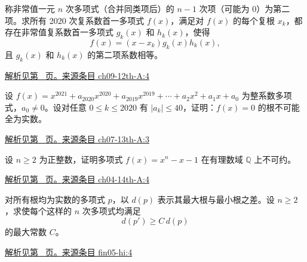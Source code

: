 \documentclass[UTF8,12pt,a4paper,fontset=fandol]{ctexart}
\begin{document}
\begin{example}\label{ex:ch09-12th-A:4}

称非常值一元 $n$ 次多项式（合并同类项后）的 $n-1$ 次项（可能为 0）为第二项。求所有 2020 次复系数首一多项式 $f(x)$，满足对 $f(x)$ 的每个复根 $x_{k}$，都存在非常值复系数首一多项式 $g_{k}(x)$ 和 $h_{k}(x)$，使得
\[
f(x)=\left(x-x_{k}\right)g_{k}(x)h_{k}(x),
\]
且 $g_{k}(x)$ 和 $h_{k}(x)$ 的第二项系数相等。

\par\hyperref[ans:ch09-12th-A:4]{解析见第~\pageref{ans:ch09-12th-A:4} 页。}\quad\href{https://github.com/lzxcr/cmc-mathematics/blob/64916fa1fdbc3e444a652eca204d5669058ee321/src/problems/preliminary/12/04.md}{来源条目 ch09-12th-A:4}

\end{example}

\begin{example}\label{ex:ch07-13th-A:3}

设 $f(x)=x^{2021}+a_{2020}x^{2020}+a_{2019}x^{2019}+\cdots+a_{2}x^{2}+a_{1}x+a_{0}$ 为整系数多项式，$a_{0}\neq 0$。设对任意 $0\leq k\leq 2020$ 有 $\left|a_{k}\right|\leq 40$，证明：$f(x)=0$ 的根不可能全为实数。

\par\hyperref[ans:ch07-13th-A:3]{解析见第~\pageref{ans:ch07-13th-A:3} 页。}\quad\href{https://github.com/lzxcr/cmc-mathematics/blob/64916fa1fdbc3e444a652eca204d5669058ee321/src/problems/preliminary/13/03.md}{来源条目 ch07-13th-A:3}

\end{example}

\begin{example}\label{ex:ch04-14th-A:4}

设 $n\geq 2$ 为正整数，证明多项式 $f(x)=x^{n}-x-1$ 在有理数域 $\mathbb{Q}$ 上不可约。

\par\hyperref[ans:ch04-14th-A:4]{解析见第~\pageref{ans:ch04-14th-A:4} 页。}\quad\href{https://github.com/lzxcr/cmc-mathematics/blob/64916fa1fdbc3e444a652eca204d5669058ee321/src/problems/preliminary/14/04.md}{来源条目 ch04-14th-A:4}

\end{example}

\begin{example}\label{ex:fin05-hi:4}

对所有根均为实数的多项式 $p$，以 $d(p)$ 表示其最大根与最小根之差。设 $n\ge2$，求使每个这样的 $n$ 次多项式均满足
\[
d(p')\ge C\,d(p)
\]
的最大常数 $C$。

\par\hyperref[ans:fin05-hi:4]{解析见第~\pageref{ans:fin05-hi:4} 页。}\quad\href{https://github.com/lzxcr/cmc-mathematics/blob/64916fa1fdbc3e444a652eca204d5669058ee321/src/problems/finals/05/04.md}{来源条目 fin05-hi:4}

\end{example}
\end{document}
